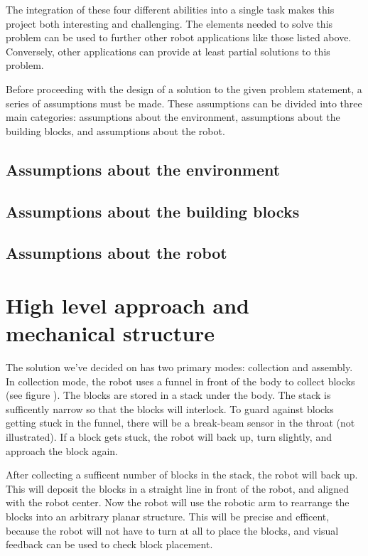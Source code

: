 \documentclass[letterpaper,12pt]{article}
\begin{document}
The integration of these four different abilities into a single task makes this project both interesting and challenging.  The elements needed to solve this problem can be used to further other robot applications like those listed above.  Conversely, other applications can provide at least partial solutions to this problem. 

Before proceeding with the design of a solution to the given problem statement, a series of assumptions must be made.  These assumptions can be divided into three main categories: assumptions about the environment, assumptions about the building blocks, and assumptions about the robot.

\subsection{Assumptions about the environment}

\subsection{Assumptions about the building blocks}

\subsection{Assumptions about the robot}


\section{High level approach and mechanical structure}
The solution we've decided on has two primary modes: collection and assembly.
In collection mode, the robot uses a funnel in front of the body to collect blocks (see figure ).
The blocks are stored in a stack under the body.
The stack is sufficently narrow so that the blocks will interlock.
To guard against blocks getting stuck in the funnel,
there will be a break-beam sensor in the throat (not illustrated).
If a block gets stuck, the robot will back up, turn slightly, and approach the block again.

After collecting a sufficent number of blocks in the stack, the robot will back up.
This will deposit the blocks in a straight line in front of the robot, and aligned with the robot center.
Now the robot will use the robotic arm to rearrange the blocks into an arbitrary planar structure.
This will be precise and efficent, because the robot will not have to turn at all to place the blocks,
and visual feedback can be used to check block placement.
\end{document}
